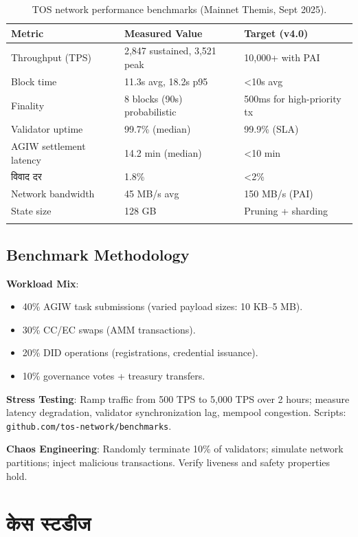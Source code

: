 \documentclass[11pt]{article}
\begin{document}
\begin{itemize}[noitemsep]
\begin{itemize}[noitemsep]
\begin{itemize}[noitemsep]
\begin{itemize}[noitemsep]
\begin{itemize}[noitemsep]
\begin{itemize}[noitemsep]
\begin{longtable}{@{}p{}p{}p{}@{}}
\toprule
\textbf{Metric} & \textbf{Measured Value} & \textbf{Target (v4.0)} \\\midrule
Throughput (TPS) & 2,847 sustained, 3,521 peak & 10,000+ with PAI \\
Block time & 11.3s avg, 18.2s p95 & <10s avg \\
Finality & 8 blocks (90s) probabilistic & 500ms for high-priority tx \\
Validator uptime & 99.7\% (median) & 99.9\% (SLA) \\
AGIW settlement latency & 14.2 min (median) & <10 min \\
विवाद दर & 1.8\% & <2\% \\
Network bandwidth & 45 MB/s avg & 150 MB/s (PAI) \\
State size & 128 GB & Pruning + sharding \\
\bottomrule
\caption{TOS network performance benchmarks (Mainnet Themis, Sept 2025).}
\end{longtable}

\subsection{Benchmark Methodology}

\textbf{Workload Mix}:
\begin{itemize}[noitemsep]
  \item 40\% AGIW task submissions (varied payload sizes: 10 KB--5 MB).
  \item 30\% CC/EC swaps (AMM transactions).
  \item 20\% DID operations (registrations, credential issuance).
  \item 10\% governance votes + treasury transfers.
\end{itemize}

\textbf{Stress Testing}: Ramp traffic from 500 TPS to 5,000 TPS over 2 hours; measure latency degradation, validator synchronization lag, mempool congestion. Scripts: \texttt{github.com/tos-network/benchmarks}.

\textbf{Chaos Engineering}: Randomly terminate 10\% of validators; simulate network partitions; inject malicious transactions. Verify liveness and safety properties hold.

\section{केस स्टडीज}
\label{sec:case-studies}


\end{itemize}
\end{itemize}
\end{itemize}
\end{itemize}
\end{itemize}
\end{itemize}
\end{document}
